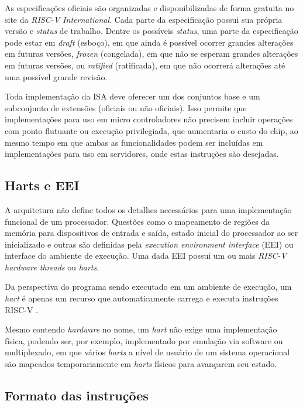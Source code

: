   As especificações oficiais são organizadas e disponibilizadas de forma gratuita 
  no site da \emph{RISC-V International}. Cada parte da especificação possui sua própria versão 
  e \emph{status} de trabalho. Dentre os possíveis \emph{status}, uma parte da especificação pode 
  estar em \emph{draft} (esboço), em que ainda é possível ocorrer grandes alterações 
  em futuras versões, \emph{frozen} (congelada), em que não se esperam grandes alterações 
  em futuras versões, ou \emph{ratified} (ratificada), em que não ocorrerá alterações até
  uma possível grande revisão.
  
  Toda implementação da ISA deve oferecer um dos conjuntos base e um subconjunto de 
  extensões (oficiais ou não oficiais). Isso permite que implementações para uso em 
  micro controladores não precisem incluir operações com ponto flutuante ou execução 
  privilegiada, que aumentaria o custo do chip, ao mesmo tempo em que ambas as funcionalidades
  podem ser incluídas em implementações para uso em servidores, onde estas instruções são
  desejadas.
  
\subsection{Harts e EEI}
\label{sec:harts}

  A arquitetura não define todos os detalhes necessários para uma implementação funcional 
  de um processador. Questões como o mapeamento de regiões da memória para dispositivos 
  de entrada e saída, estado inicial do processador ao ser inicializado e outras são 
  definidas pela \emph{execution environment interface} (EEI) ou interface do ambiente de execução. 
  Uma dada EEI possui um ou mais \emph{RISC-V hardware threads} ou \emph{harts}.

  Da perspectiva do programa sendo executado em um ambiente de execução, um \emph{hart}
  é apenas um recurso que automaticamente carrega e executa instruções RISC-V \citep{RVS1}.
  
  Mesmo contendo \emph{hardware} no nome, um \emph{hart} não exige uma implementação física,
  podendo ser, por exemplo, implementado por emulação via software ou multiplexado, em que vários
  \emph{harts} a nível de usuário de um sistema operacional são mapeados temporariamente em 
  \emph{harts} físicos para avançarem seu estado.

\subsection{Formato das instruções}
\label{sec:instfmt}

